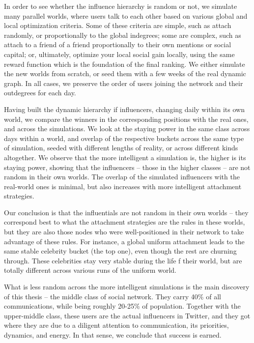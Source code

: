 \documentclass[10pt,oneside]{memoir}
\begin{document}
In order to see whether the influence hierarchy is random or not, we simulate many parallel worlds, where users talk to each other based on various global and local optimization criteria.  Some of these criteria are simple, such as attach randomly, or proportionally to the global indegrees; some are complex, such as attach to a friend of a friend proportionally to their own mentions or social capital; or, ultimately, optimize your local social gain locally, using the same reward function which is the foundation of the final ranking.  We either simulate the new worlds from scratch, or seed them with a few weeks of the real dynamic graph.  In all cases, we preserve the order of users joining the network and their outdegrees for each day.


Having built the dynamic hierarchy if influencers, changing daily within its own world, we compare the winners in the corresponding positions with the real ones, and across the simulations.  We look at the staying power in the same class across days within a world, and overlap of the respective buckets across the same type of simulation, seeded with different lengths of reality, or across different kinds altogether.
We observe that the more intelligent a simulation is, the higher is its staying power, showing that the influencers -- those in the higher classes -- are not random in their own worlds.  The overlap of the simulated influencers with the real-world ones is minimal, but also increases with more intelligent attachment strategies.


Our conclusion is that the influentials are not random in their own worlds -- they correspond best to what the attachment strategies are the rules in these worlds, but they are also those nodes who were well-positioned in their network to take advantage of these rules.  For instance, a global uniform attachment leads to the same stable celebrity bucket (the top one), even though the rest are churning through.  These celebrities stay very stable during the life f their world, but are totally different across various runs of the uniform world.


What is less random across the more intelligent simulations is the main discovery of this thesis -- the middle class of social network.  They carry 40\% of all communications, while being roughly 20-25\% of population.  Together with the upper-middle class, these users are the actual influencers in Twitter, and they got where they are due to a diligent attention to communication, its priorities, dynamics, and energy.  In that sense, we conclude that success is earned.
\end{document}
